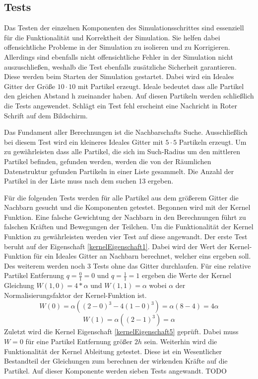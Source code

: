 \documentclass[a4paper, 12pt]{article}
\begin{document}
\subsection{Tests}
Das Testen der einzelnen Komponenten des Simulationsschrittes sind essenziell für die Funktionalität und Korrektheit der Simulation. Sie helfen dabei offensichtliche Probleme in der Simulation zu isolieren und zu Korrigieren. Allerdings sind ebenfalls nicht offensichtliche Fehler in der Simulation nicht auszuschließen, weshalb die Test ebenfalls zusätzliche Sicherheit garantieren. Diese werden beim Starten der Simulation gestartet. Dabei wird ein Ideales Gitter der Größe  $10 \cdot 10$  mit Partikel erzeugt. Ideale bedeutet dass alle Partikel den gleichen Abstand h zueinander haben. Auf diesen Partikeln werden schließlich die Tests angewendet. Schlägt ein Test fehl erscheint eine Nachricht in Roter Schrift auf dem Bildschirm. 

Das Fundament aller Berechnungen ist die Nachbarschafts Suche. Ausschließlich bei diesem Test wird ein kleineres Ideales Gitter mit $5 \cdot 5$ Partikeln erzeugt. Um zu gewährleisten dass alle Partikel, die sich im Such-Radius um den mittleren Partikel befinden, gefunden werden, werden die von der Räumlichen Datenstruktur gefunden Partikeln in einer Liste gesammelt. Die Anzahl der Partikel in der Liste muss nach dem suchen 13 ergeben.

Für die folgenden Tests werden für alle Partikel aus dem größerem Gitter die Nachbarn gesucht und die Komponenten getestet. 
Begonnen wird mit der Kernel Funktion. Eine falsche Gewichtung der Nachbarn in den Berechnungen führt zu falschen Kräften und Bewegungen der Teilchen. Um die Funktionalität der Kernel Funktion zu gewährleisten werden vier Test auf diese angewandt. Der erste Test beruht auf der Eigenschaft \eqref{kernelEigenschaft1}. Dabei wird der Wert der Kernel-Funktion für ein Ideales Gitter an Nachbarn berechnet, welcher eins ergeben soll. Des weiterem werden noch 3 Tests ohne das Gitter durchlaufen. Für eine relative Partikel Entfernung $q= \frac{0}{1} = 0$ und $q = \frac{1}{1} = 1$ ergeben die Werte der Kernel Gleichung $W(1, 0) = 4 * \alpha$ und $W(1, 1) = \alpha$ wobei $\alpha$ der Normalisierungsfaktor der Kernel-Funktion ist. 
\[W(0) = \alpha ((2-0)^3 - 4(1-0)^3) = \alpha (8 - 4) = 4\alpha\]
\[W(1) = \alpha ((2-1)^3) = \alpha\]
Zuletzt wird die Kernel Eigenschaft \eqref{kernelEigenschaft5} geprüft. Dabei muss $W = 0$ für eine Partikel Entfernung größer $2h$ sein.
Weiterhin wird die Funktionalität der Kernel Ableitung getestet. Diese ist ein Wesentlicher Bestandteil der Gleichungen zum berechnen der wirkenden Kräfte auf die Partikel. Auf dieser Komponente werden sieben Tests angewandt. TODO
\end{document}
